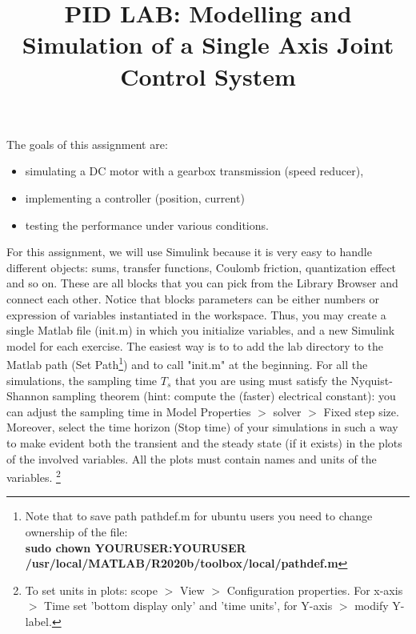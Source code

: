 \documentclass[11pt]{article}
\title{PID LAB: Modelling and Simulation of a Single Axis Joint Control System }
\author{}
\date{}
\begin{document}
\maketitle
The goals of this assignment are:
\begin{itemize}
    \item simulating a DC motor with a gearbox transmission (speed reducer),
    \item implementing a controller (position, current)
    \item testing the performance under various conditions.
\end{itemize}
%
%
For this assignment, we will use Simulink because it is very easy to handle different 
objects: sums, transfer functions, Coulomb friction, quantization effect and so on. 
These  are all blocks that you can pick from the Library Browser and connect each other. 
Notice that blocks parameters can be either numbers or expression of variables instantiated in the workspace. 
Thus, you may create a single Matlab file (init.m) in which you initialize variables, and a new Simulink model for each exercise. 
The easiest way is to to add the lab directory to the Matlab path (Set Path\footnote{Note that to save path pathdef.m for ubuntu users you need to change ownership of the file: \\ \textbf{sudo chown YOURUSER:YOURUSER /usr/local/MATLAB/R2020b/toolbox/local/pathdef.m}}) and to 
call "init.m" at the beginning.
For all the simulations, the sampling time $T_s$ that you are using must satisfy 
the Nyquist-Shannon sampling theorem (hint: compute the (faster) electrical constant): 
you can adjust the sampling time in Model Properties $>$ solver $>$ Fixed step size. %
Moreover, select the time horizon (Stop time) of your simulations in such a way to 
make evident both the transient and the steady state (if it exists) 
in the plots of the involved variables. All the plots must contain names and units of the variables.
\footnote{To set units in plots: scope $>$ View $>$ Configuration properties. For x-axis $>$ Time set 'bottom display only' and 'time units', for Y-axis $>$ modify Y-label.}


%
\end{document}

